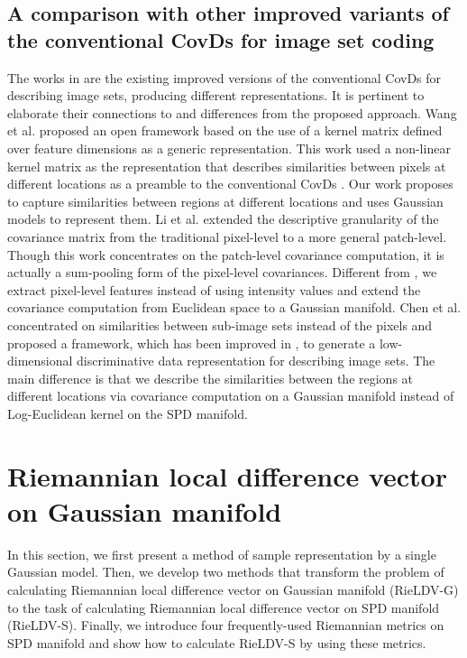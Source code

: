 \documentclass[review]{elsarticle}
\begin{document}
\subsection{A comparison with other improved variants of the conventional CovDs for image set coding}
	The works in \cite{wang2015beyond,li2016spatial,chen2018Component} are the existing improved versions of the conventional CovDs for describing image sets, producing different representations. It is pertinent to elaborate their connections to and differences from the proposed approach.
 Wang et al.\cite{wang2015beyond} proposed an open framework based on the use of a kernel matrix defined over feature dimensions as a generic representation. This work used a non-linear kernel matrix as the representation that describes  similarities between pixels at different locations as a preamble to the conventional CovDs \cite{wang2012covariance}. Our work proposes to capture similarities between regions at different locations and uses  Gaussian models to represent them.
 Li et al.\cite{li2016spatial} extended the descriptive granularity of the covariance matrix from the traditional pixel-level to a more general patch-level. Though this work concentrates on the patch-level covariance computation, it is actually a sum-pooling form of the pixel-level covariances. Different from \cite{li2016spatial}, we extract pixel-level features instead of using intensity values and extend the covariance computation from Euclidean space to a Gaussian manifold. 
	Chen et al.\cite{chen2018Component} concentrated on similarities between  sub-image sets instead of the pixels and proposed a framework, which has been improved in \cite{chen2019more}, to generate a low-dimensional discriminative data representation for describing image sets. The main difference is that we describe the similarities between the regions at different locations via covariance computation on a Gaussian manifold instead of Log-Euclidean kernel \cite{wang2012covariance} on the SPD manifold.

\section{Riemannian local difference vector on Gaussian manifold}
In this section, we first present a method of sample representation by a single Gaussian model. Then, we develop two methods that transform the problem of calculating Riemannian local difference vector on Gaussian manifold (RieLDV-G) to the task of calculating Riemannian local difference vector on SPD manifold (RieLDV-S). Finally, we introduce four frequently-used Riemannian metrics on SPD manifold and show how to calculate RieLDV-S by using these metrics.
\end{document}
